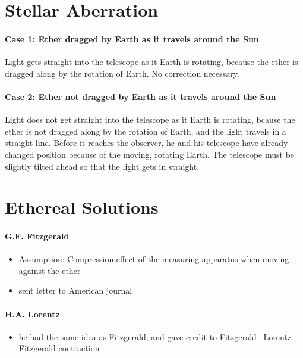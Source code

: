\documentclass[pagesize,headsepline,10pt,parskip=half]{scrreprt}
\begin{document}
    \section{Stellar Aberration}
      \paragraph{Case 1: Ether dragged by Earth as it travels around the Sun}
        Light gets straight into the telescope as it Earth is rotating,
        because the ether is dragged along by the rotation of Earth.
        No correction necessary.

      \paragraph{Case 2: Ether not dragged by Earth as it travels around the Sun}
        Light does not get straight into the telescope as it Earth is rotating,
        bcause the ether is not dragged along by the rotation of Earth, and
        the light travels in a straight line.  Before it reaches the observer,
        he and his telescope have already changed position because
        of the moving, rotating Earth.  The telescope must be slightly tilted
        ahead so that the light gets in straight.

    \section{Ethereal Solutions}
      \paragraph{G.F. Fitzgerald}
        \begin{itemize}
          \item Assumption: Compression effect of the measuring apparatus when moving against the ether
          \item sent letter to American journal
        \end{itemize}

      \paragraph{H.A. Lorentz}
        \begin{itemize}
          \item he had the same idea as Fitzgerald, and gave credit to Fitzgerald
          \rightarrow~Lorentz–Fitzgerald contraction
        \end{itemize}
\end{document}
